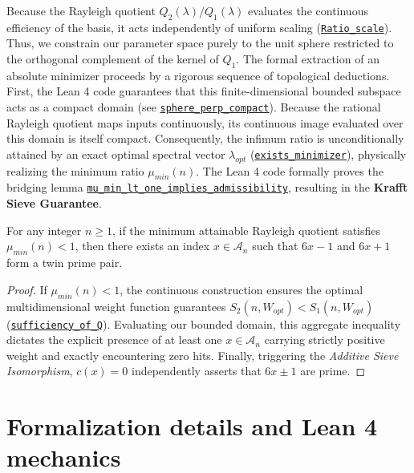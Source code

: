 \documentclass[lean]{AFM}
\renewcommand{\.}{\hskip .75pt}
\def\urlpfx{https://github.com/ElNando888/KrafftSieve/blob/v1.2}
\begin{document}
Because the Rayleigh quotient $Q_2(\lambda) / Q_1(\lambda)$ evaluates the continuous efficiency
of the basis, it acts independently of uniform scaling
(\href{\urlpfx/KrafftSieve/OptimalWeights.lean#L357}{\texttt{Ratio\_scale}}). Thus, we constrain
our parameter space purely to the unit sphere restricted to the orthogonal complement of the kernel
of $Q_1$. The formal extraction of an absolute minimizer proceeds by a rigorous sequence of
topological deductions. First, the Lean 4 code guarantees that this finite-dimensional bounded
subspace acts as a compact domain (see \href{\urlpfx/KrafftSieve/OptimalWeights.lean#L442}
{\texttt{sphere\_perp\_compact}}). Because the rational Rayleigh quotient maps inputs continuously,
its continuous image evaluated over this domain is itself compact. Consequently, the infimum ratio
is unconditionally attained by an exact optimal spectral vector $\lambda_{opt}$
(\href{\urlpfx/KrafftSieve/OptimalWeights.lean#L603}{\texttt{exists\_minimizer}}), physically
realizing the minimum ratio $\mu_{min}(n)$. The Lean 4 code formally
proves the bridging lemma \href{\urlpfx/KrafftSieve/OptimalWeights.lean#L195}
{\texttt{mu\_min\_lt\_one\_implies\_admissibility}}, resulting in
the \textbf{Krafft Sieve Guarantee}.

\begin{theorem}
For any integer $n \ge 1$, if the minimum attainable Rayleigh quotient satisfies $\mu_{min}(n) < 1$,
then there exists an index $x \in \mathcal{A}_n$ such that $6x-1$ and $6x+1$ form a twin prime pair.
\end{theorem}
\begin{proof}
If $\mu_{min}(n) < 1$, the continuous construction ensures the optimal multidimensional weight
function guarantees $S_2(n, W_{opt}) < S_1(n, W_{opt})$
(\href{\urlpfx/KrafftSieve/OptimalWeights.lean#L173}{\texttt{sufficiency\_of\_Q}}).
Evaluating our bounded domain, this aggregate inequality dictates the explicit presence of at least
one $x \in \mathcal{A}_n$ carrying strictly positive weight and exactly encountering zero hits.
Finally, triggering the \textit{Additive Sieve Isomorphism}, $c(x) = 0$ independently asserts
that $6x \pm 1$ are prime.
\end{proof}

\section{Formalization details and Lean 4 mechanics} \label{formalization}
\end{document}
